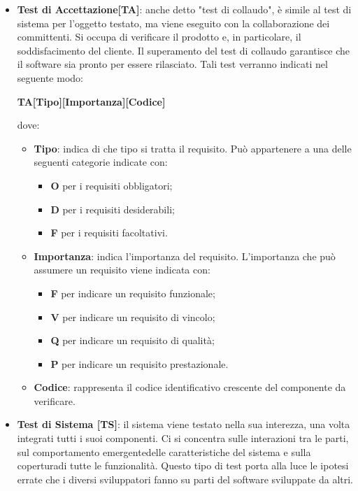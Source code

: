 		\begin{itemize}
			\item \textbf{Test di Accettazione[TA]}: anche detto "test di collaudo", è simile al test di sistema per l'oggetto testato, ma viene eseguito con la collaborazione dei committenti. Si occupa di verificare il prodotto e, in particolare, il soddisfacimento del cliente. Il superamento del test di collaudo garantisce che il software sia pronto per essere rilasciato. Tali test verranno indicati nel seguente modo: \\
			\centerline{\textbf{TA[Tipo][Importanza][Codice]}}
			dove:
			\begin{itemize}
				\item \textbf{Tipo}: indica di che tipo si tratta il requisito. Può
				appartenere a una delle seguenti categorie indicate con:
				\begin{itemize}
					\item \textbf{O} per i requisiti obbligatori;
					\item \textbf{D} per i requisiti desiderabili;
					\item \textbf{F} per i requisiti facoltativi.			
				\end{itemize}
				\item \textbf{Importanza}: indica l'importanza del requisito. L'importanza
				che può assumere un requisito viene indicata con:
				\begin{itemize}
					\item \textbf{F} per indicare un requisito funzionale;
					\item \textbf{V} per indicare un requisito di vincolo;
					\item \textbf{Q} per indicare un requisito di qualità;
					\item \textbf{P} per indicare un requisito prestazionale. 
				\end{itemize}
				\item \textbf{Codice}: rappresenta il codice identificativo crescente
				del componente da verificare.
			\end{itemize}
			\item \textbf{Test di Sistema [TS]}: il sistema viene testato nella sua interezza, una volta integrati tutti i suoi componenti. Ci si concentra sulle interazioni tra le parti, sul comportamento emergente\glosp delle caratteristiche del sistema e sulla copertura\glosp di tutte le funzionalità. Questo tipo di test porta alla luce le ipotesi errate che i diversi sviluppatori fanno su parti del software sviluppate da altri.

\end{itemize}
